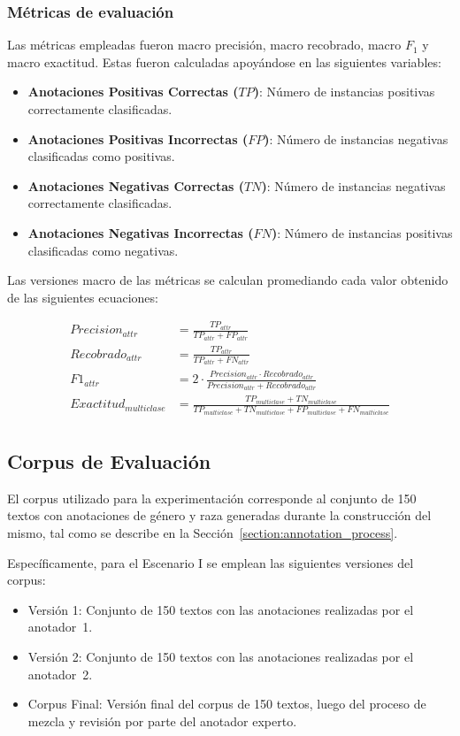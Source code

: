 \subsubsection{M\'etricas de evaluaci\'on}
Las m\'etricas empleadas fueron macro precisi\'on, macro recobrado, macro $F_1$ y 
macro exactitud. Estas fueron calculadas apoy\'andose en las siguientes variables: 

\begin{itemize}
    \item \textbf{Anotaciones Positivas Correctas ($TP$)}: N\'umero de instancias positivas correctamente clasificadas.
    \item \textbf{Anotaciones Positivas Incorrectas ($FP$)}: N\'umero de instancias negativas clasificadas como positivas.
    \item \textbf{Anotaciones Negativas Correctas ($TN$)}: N\'umero de instancias negativas correctamente clasificadas.
    \item \textbf{Anotaciones Negativas Incorrectas ($FN$)}: N\'umero de instancias positivas clasificadas como negativas.
\end{itemize}

Las versiones macro de las m\'etricas se calculan promediando cada valor obtenido de las siguientes ecuaciones:

\begin{align}
    Precision_{attr} &= \frac{TP_{attr}}{TP_{attr} + FP_{attr}}\\
    Recobrado_{attr} &= \frac{TP_{attr}}{TP_{attr} + FN_{attr}}\\
    F1_{attr} &= 2 \cdot \frac{{Precision_{attr}} \cdot {Recobrado_{attr}}}{{Precision_{attr}} + {Recobrado_{attr}}}\\
    Exactitud_{multiclase} &= \frac{TP_{multiclase} + TN_{multiclase}}{TP_{multiclase} + TN_{multiclase} + FP_{multiclase} + FN_{multiclase}}\\
\end{align}


\subsection{Corpus de Evaluaci\'on}
El corpus utilizado para la experimentaci\'on corresponde al conjunto de 150 textos con anotaciones de g\'enero y raza
generadas durante la construcci\'on del mismo, tal como se describe en la Secci\'on~\ref{section:annotation_process}.

Espec\'ificamente, para el Escenario I se emplean las siguientes versiones del corpus:
\begin{itemize}
    \item Versi\'on 1: Conjunto de 150 textos con las anotaciones realizadas por el anotador~1.
    \item Versi\'on 2: Conjunto de 150 textos con las anotaciones realizadas por el anotador~2.
    \item Corpus Final: Versi\'on final del corpus de 150 textos, luego del proceso de mezcla y revisi\'on por parte 
    del anotador experto.
\end{itemize}

